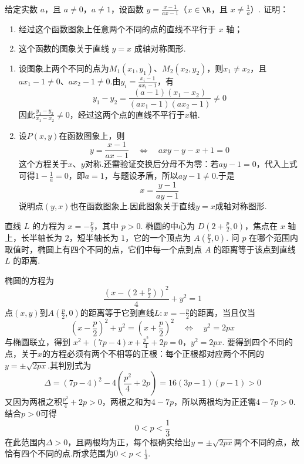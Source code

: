 \documentclass[UTF8,a4paper,oneside,11pt]{ctexbook}
\begin{document}
\begin{problem}

给定实数 \(a\)，且 \(a \neq 0\)，\(a \neq 1\)，设函数 \(y = \frac{x - 1}{ax - 1}\)（\(x \in \R\)，且 \(x \neq \frac{1}{a}\)）. 证明：
\begin{enumerate}
\item 经过这个函数图象上任意两个不同的点的直线不平行于 \(x\) 轴；
\item 这个函数的图象关于直线 \(y = x\) 成轴对称图形.
\end{enumerate}
\end{problem}

\begin{solution}
\begin{enumerate}
\item 设图象上两个不同的点为\(M_1(x_1,y_1)\)、\(M_2(x_2,y_2)\)，则\(x_1\ne x_2\)，且\(ax_1-1\ne0\)、\(ax_2-1\ne0\).由\(y_i=\frac{x_i-1}{ax_i-1}\)，有
\[
y_1-y_2
=\frac{(a-1)(x_1-x_2)}{(ax_1-1)(ax_2-1)}\ne0
\]
因此\(\frac{y_1-y_2}{x_1-x_2}\ne0\)，经过这两个点的直线不平行于\(x\)轴.

\item 设\(P(x,y)\)在函数图象上，则
\[
y=\frac{x-1}{ax-1}
\quad\Longleftrightarrow\quad
axy-y-x+1=0
\]
这个方程关于\(x\)、\(y\)对称.还需验证交换后分母不为零：若\(ay-1=0\)，代入上式可得\(1-\frac1a=0\)，即\(a=1\)，与题设矛盾，所以\(ay-1\ne0\).于是
\[
x=\frac{y-1}{ay-1}
\]
说明点\((y,x)\)也在函数图象上.因此图象关于直线\(y=x\)成轴对称图形.
\end{enumerate}
\end{solution}

\begin{problem}

直线 \(L\) 的方程为 \(x = -\frac{p}{2}\)，其中 \(p > 0\). 椭圆的中心为 \(D\left(2+\frac{p}{2},0\right)\)，焦点在 \(x\) 轴上，长半轴长为 \(2\)，短半轴长为 \(1\)，它的一个顶点为 \(A\left(\frac{p}{2},0\right)\). 问 \(p\) 在哪个范围内取值时，椭圆上有四个不同的点，它们中每一个点到点 \(A\) 的距离等于该点到直线 \(L\) 的距离.
\end{problem}

\begin{solution}
椭圆的方程为
\[
\frac{\left(x-\left(2+\frac p2\right)\right)^2}{4}+y^2=1
\]
点\((x,y)\)到\(A\left(\frac p2,0\right)\)的距离等于它到直线\(L:x=-\frac p2\)的距离，当且仅当
\[
\left(x-\frac p2\right)^2+y^2=\left(x+\frac p2\right)^2
\quad\Longleftrightarrow\quad
y^2=2px
\]
与椭圆联立，得到
\(x^2+(7p-4)x+\frac{p^2}{4}+2p=0\)，\(y^2=2px\).
要得到四个不同的点，关于\(x\)的方程必须有两个不相等的正根：每个正根都对应两个不同的\(y=\pm\sqrt{2px}\).其判别式为
\[
\Delta=(7p-4)^2-4\left(\frac{p^2}{4}+2p\right)
=16(3p-1)(p-1)>0
\]
又因为两根之积\(\frac{p^2}{4}+2p>0\)，两根之和为\(4-7p\)，所以两根均为正还需\(4-7p>0\).结合\(p>0\)可得
\[
0<p<\frac13
\]
在此范围内\(\Delta>0\)，且两根均为正，每个根确实给出\(y=\pm\sqrt{2px}\)两个不同的点，故恰有四个不同的点.所求范围为\(0<p<\frac13\).
\end{solution}

\end{document}
